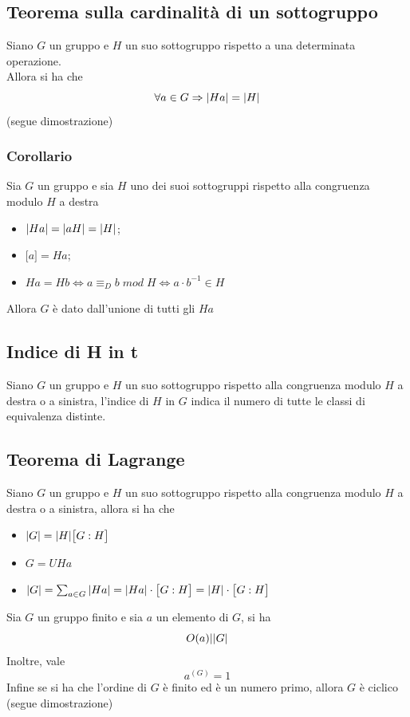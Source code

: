 \begin{flushleft}
\subsection{Teorema sulla cardinalità di un sottogruppo}
Siano $G$ un gruppo e $H$ un suo sottogruppo rispetto a una determinata operazione.\\
Allora si ha che
\[\forall a \in G \Rightarrow \abs{H a} = \abs{H}\]
(segue dimostrazione)
\\ \vspace{300px}

\subsubsection{Corollario}
Sia $G$ un gruppo e sia $H$ uno dei suoi sottogruppi rispetto alla congruenza modulo $H$ a destra
\begin{itemize}
    \item[] $\abs{H a} = \abs{aH} = \abs{H}$;
    \item[] $\big[a\big]=Ha$;
    \item[] $Ha = Hb \Leftrightarrow a\equiv_D b\;mod\; H\Leftrightarrow a\cdot b^{-1}\in H$
\end{itemize}
Allora $G$ è dato dall'unione di tutti gli $Ha$

\subsection{Indice di H in t}
Siano $G$ un gruppo e $H$ un suo sottogruppo rispetto alla congruenza modulo $H$ a destra o a sinistra, l'indice di $H$ in $G$ indica il numero di tutte le classi di equivalenza distinte.

\subsection{Teorema di Lagrange}
Siano $G$ un gruppo e $H$ un suo sottogruppo rispetto alla congruenza modulo $H$ a destra o a sinistra, allora si ha che
\begin{itemize}
    \item[] $\abs{G} = \abs{H} \big[G:H\big]$
    \item[] $G = UHa$
    \item[] $\abs{G} =\sum_{a\in G} \abs{Ha} = \abs{Ha}\cdot \big[G:H\big] = \abs{H}\cdot\big[G:H\big]$
\end{itemize}
Sia $G$ un gruppo finito e sia $a$ un elemento di $G$, si ha 
\[O(a)| \abs{G}\]
Inoltre, vale
\[a^(G) = 1\]
Infine se si ha che l'ordine di $G$ è finito ed è un numero primo, allora $G$ è ciclico
(segue dimostrazione)
\\ \vspace{300px}











\end{flushleft}
